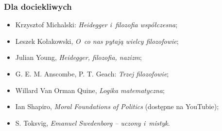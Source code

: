 \documentclass[10pt,t]{beamer}
\begin{document}
\begin{frame}
  \frametitle{Dla dociekliwych}


  \begin{itemize}

  \item Krzysztof Michalski: \textit{Heidegger i~filozofia
      współczesna};

  \item Leszek Kołakowski, \textit{O~co nas pytają wielcy
    filozofowie};

  \item Julian Young, \textit{Heidegger, filozofia, nazizm};

  \item G. E. M. Anscombe, P. T. Geach: \textit{Trzej
      filozofowie};

  \item Willard Van Orman Quine, \textit{Logika matematyczna};

  \item Ian Shapiro, \textit{Moral Foundations of Politics}
    (dostępne na YouTubie);

  \item S. Toksvig, \textit{Emanuel Swedenborg -- uczony i~mistyk}.

  \end{itemize}

\end{frame}











\end{document}
